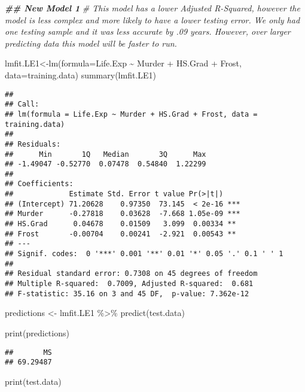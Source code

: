 \documentclass[
]{article}
\newenvironment{Shaded}{\begin{snugshade}}{\end{snugshade}}
\newcommand{\AttributeTok}[1]{\textcolor[rgb]{0.77,0.63,0.00}{#1}}
\newcommand{\CommentTok}[1]{\textcolor[rgb]{0.56,0.35,0.01}{\textit{#1}}}
\newcommand{\DocumentationTok}[1]{\textcolor[rgb]{0.56,0.35,0.01}{\textbf{\textit{#1}}}}
\newcommand{\FunctionTok}[1]{\textcolor[rgb]{0.00,0.00,0.00}{#1}}
\newcommand{\NormalTok}[1]{#1}
\newcommand{\OtherTok}[1]{\textcolor[rgb]{0.56,0.35,0.01}{#1}}
\newcommand{\SpecialCharTok}[1]{\textcolor[rgb]{0.00,0.00,0.00}{#1}}
\begin{document}
\begin{Shaded}
\begin{Highlighting}[]
\DocumentationTok{\#\# New Model 1}
\CommentTok{\#  This model has a lower Adjusted R{-}Squared, however the model is less complex and more likely to have a lower testing error. We only had one testing sample and it was less accurate by .09 years. However, over larger predicting data this model will be faster to run.}

\NormalTok{lmfit.LE1}\OtherTok{\textless{}{-}}\FunctionTok{lm}\NormalTok{(}\AttributeTok{formula=}\NormalTok{Life.Exp }\SpecialCharTok{\textasciitilde{}}\NormalTok{ Murder }\SpecialCharTok{+}\NormalTok{ HS.Grad }\SpecialCharTok{+}\NormalTok{ Frost, }\AttributeTok{data=}\NormalTok{training.data)}
\FunctionTok{summary}\NormalTok{(lmfit.LE1)}
\end{Highlighting}
\end{Shaded}

\begin{verbatim}
## 
## Call:
## lm(formula = Life.Exp ~ Murder + HS.Grad + Frost, data = training.data)
## 
## Residuals:
##      Min       1Q   Median       3Q      Max 
## -1.49047 -0.52770  0.07478  0.54840  1.22299 
## 
## Coefficients:
##             Estimate Std. Error t value Pr(>|t|)    
## (Intercept) 71.20628    0.97350  73.145  < 2e-16 ***
## Murder      -0.27818    0.03628  -7.668 1.05e-09 ***
## HS.Grad      0.04678    0.01509   3.099  0.00334 ** 
## Frost       -0.00704    0.00241  -2.921  0.00543 ** 
## ---
## Signif. codes:  0 '***' 0.001 '**' 0.01 '*' 0.05 '.' 0.1 ' ' 1
## 
## Residual standard error: 0.7308 on 45 degrees of freedom
## Multiple R-squared:  0.7009, Adjusted R-squared:  0.681 
## F-statistic: 35.16 on 3 and 45 DF,  p-value: 7.362e-12
\end{verbatim}

\begin{Shaded}
\begin{Highlighting}[]
\NormalTok{predictions }\OtherTok{\textless{}{-}}\NormalTok{ lmfit.LE1 }\SpecialCharTok{\%\textgreater{}\%} \FunctionTok{predict}\NormalTok{(test.data)}

\FunctionTok{print}\NormalTok{(predictions)}
\end{Highlighting}
\end{Shaded}

\begin{verbatim}
##       MS 
## 69.29487
\end{verbatim}

\begin{Shaded}
\begin{Highlighting}[]
\FunctionTok{print}\NormalTok{(test.data)}
\end{Highlighting}
\end{Shaded}
\end{document}
